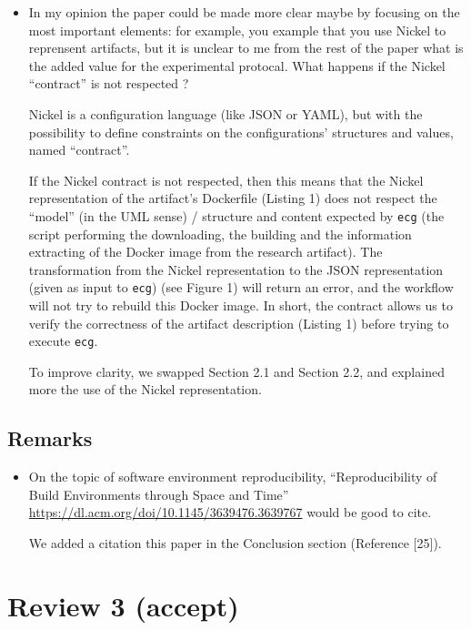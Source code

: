 \documentclass[%
	11pt,
	final,
]{article}
\begin{document}
\begin{itemize}
\item In my opinion the paper could be made more clear maybe by focusing on the most important elements: for example, you example that you use Nickel to reprensent artifacts, but it is unclear to me from the rest of the paper what is the added value for the experimental protocal. What happens if the Nickel ``contract'' is not respected ?
\begin{review-answer}
  Nickel is a configuration language (like JSON or YAML), but with the possibility to define constraints on the configurations' structures and values, named ``contract''.

  If the Nickel contract is not respected, then this means that the Nickel representation of the artifact's Dockerfile (Listing 1) does not respect the ``model'' (in the UML sense) / structure and content expected by \texttt{ecg} (the script performing the downloading, the building and the information extracting of the Docker image from the research artifact).
  The transformation from the Nickel representation to the JSON representation (given as input to \texttt{ecg}) (see Figure 1) will return an error, and the workflow will not try to rebuild this Docker image.
  In short, the contract allows us to verify the correctness of the artifact description (Listing 1) before trying to execute \texttt{ecg}.

  To improve clarity, we swapped Section 2.1 and Section 2.2, and explained more the use of the Nickel representation.
\end{review-answer}
\end{itemize}

\subsection{Remarks}

\begin{itemize}
\item On the topic of software environment reproducibility, ``Reproducibility of Build Environments through Space and Time'' \url{https://dl.acm.org/doi/10.1145/3639476.3639767} would be good to cite.
  \begin{review-answer}
    We added a citation this paper in the Conclusion section (Reference [25]).
  \end{review-answer}
\end{itemize}


\section{Review 3 (accept)}
\end{document}
